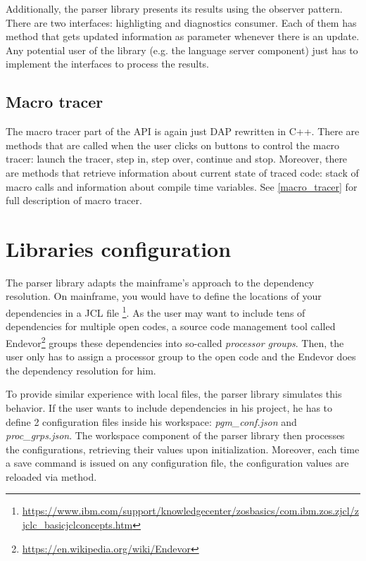 Additionally, the parser library presents its results using the observer pattern. There are two interfaces: highligting and diagnostics consumer. Each of them has method  that gets updated information as parameter whenever there is an update. Any potential user of the library (e.g. the language server component) just has to implement the interfaces to process the results.

\subsection{Macro tracer}

The macro tracer part of the API is again just DAP rewritten in C++. There are methods that are called when the user clicks on buttons to control the macro tracer: launch the tracer, step in, step over, continue and stop. Moreover, there are methods that retrieve information about current state of traced code: stack of macro calls and information about compile time variables. See \cref{macro_tracer} for full description of macro tracer.

\section{Libraries configuration}
\label{libs_config}
The parser library adapts the mainframe's approach to the dependency resolution. On mainframe, you would have to define the locations of your dependencies in a JCL file \footnote{\url{https://www.ibm.com/support/knowledgecenter/zosbasics/com.ibm.zos.zjcl/zjclc_basicjclconcepts.htm}}. As the user may want to include tens of dependencies for multiple open codes, a source code management tool called Endevor\footnote{\url{https://en.wikipedia.org/wiki/Endevor}} groups these dependencies into so-called \emph{processor groups}. Then, the user only has to assign a processor group to the open code and the Endevor does the dependency resolution for him.

To provide similar experience with local files, the parser library simulates this behavior. If the user wants to include dependencies in his project, he has to define 2 configuration files inside his workspace: \emph{pgm\_conf.json} and \emph{proc\_grps.json}. The workspace component of the parser library then processes the configurations, retrieving their values upon initialization. Moreover, each time a save command is issued on any configuration file, the configuration values are reloaded via  method.

